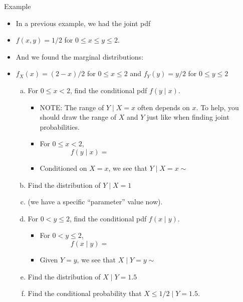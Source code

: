 \documentclass{article}
\begin{document}
Example\bigskip
\begin{itemize}
    \item In a previous example, we had the joint pdf
    \item[] $f(x, y) = 1/2$ \quad for $0 \le x \le y \le 2$.\bigskip
    \item[] And we found the marginal distributions:
    \item[] $f_X(x) = (2 - x)/2$ \quad for $0 \le x \le 2$ \hspace{30pt} and  \hspace{30pt} $f_Y(y) = y/2$ \quad for $0 \le y \le 2$\bigskip
    \begin{enumerate}[(a)]
        \item For $0 \le x < 2$, find the conditional pdf $f(y \mid x)$.\bigskip
        \begin{itemize}
            \item NOTE: The range of $Y \mid X = x$ often depends on $x$. To help, you should draw the range of $X$ and $Y$ just like when finding joint probabilities.
            \item For $0 \le x < 2$,
            \[f(y \mid x) = \hspace{200pt}\]\bigskip
            \item[] Conditioned on $X = x$, we see that $Y \mid X  = x \sim$\bigskip
        \end{itemize}\bigskip
        \item Find the distribution of $Y \mid X = 1$
        \item[] (we have a specific ``parameter'' value now).\bigskip
        \item For $0 < y \le 2$, find the conditional pdf $f(x \mid y)$.\bigskip
        \begin{itemize}
            \item For $0 < y \le 2$,
            \[f(x \mid y) = \hspace{200pt}\]\smallskip
            \item Given $Y = y$, we see that $X \mid Y = y \sim$\vspace{20pt}
        \end{itemize}\bigskip
        \item Find the distribution of $X \mid Y = 1.5$\vspace{30pt}
        \item Find the conditional probability that $X \le 1/2 \mid Y = 1.5$.\vspace{30pt}
    \end{enumerate}
\end{itemize}\newpage
\end{document}
